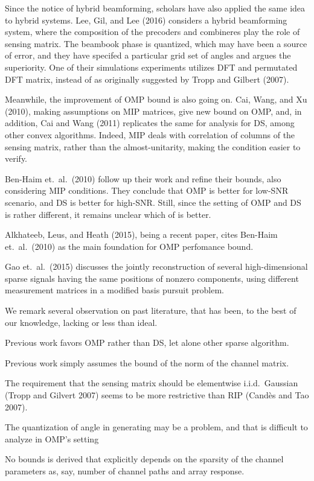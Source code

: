 Since the notice of hybrid beamforming, scholars have also applied the same idea to hybrid systems.
Lee, Gil, and Lee (2016) considers a hybrid beamforming system, where the composition of the precoders and combineres play the role of sensing matrix.
The beambook phase is quantized, which may have been a source of error, and they have specifed a particular grid set of angles and argues the superiority.
One of their simulations experiments utilizes DFT and permutated DFT matrix, instead of as originally suggested by Tropp and Gilbert (2007).

Meanwhile, the improvement of OMP bound is also going on.
Cai, Wang, and Xu (2010), making assumptions on MIP matrices, give new bound on OMP, and, in addition, Cai and Wang (2011) replicates the same for analysis for DS, among other convex algorithms.
Indeed, MIP deals with correlation of columns of the sensing matrix, rather than the almost-unitarity, making the condition easier to verify.

Ben-Haim et.\ al.\ (2010) follow up their work and refine their bounds, also considering MIP conditions.
They conclude that OMP is better for low-SNR scenario, and DS is better for high-SNR.
Still, since the setting of OMP and DS is rather different, it remains unclear which of is better.

Alkhateeb, Leus, and Heath (2015), being a recent paper, cites Ben-Haim et.\ al.\ (2010) as the main foundation for OMP perfomance bound.

Gao et.\ al.\ (2015) discusses the jointly reconstruction of several high-dimensional sparse signals having the same positions of nonzero components, using different measurement matrices in a modified basis pursuit problem.

We remark several observation on past literature, that has been, to the best of our knowledge, lacking or less than ideal.

\startitemize
\item Previous work favors OMP rather than DS, let alone other sparse algorithm.
\item Previous work simply assumes the bound of the norm of the channel matrix.
\item The requirement that the sensing matrix should be elementwise i.i.d.\ Gaussian (Tropp and Gilvert 2007) seems to be more restrictive than RIP (Cand\`es and Tao 2007).
\item The quantization of angle in generating may be a problem, and that is difficult to analyze in OMP's setting
\item No bounds is derived that explicitly depends on the sparsity of the channel parameters as, say, number of channel paths and array response.
\stopitemize

